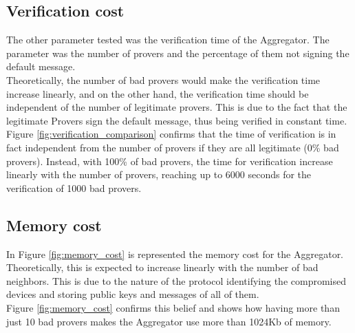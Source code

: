 \subsection{Verification cost}
The other parameter tested was the verification time of the Aggregator. 
The parameter was the number of provers and the percentage of them not signing the default message.\\
Theoretically, the number of bad provers would make the verification time increase linearly, and on the other hand, the verification time should be independent of the number of legitimate provers.
This is due to the fact that the legitimate Provers sign the default message, thus being verified in constant time.\\
Figure \ref{fig:verification_comparison} confirms that the time of verification is in fact independent from the number of provers if they are all legitimate (0\% bad provers).
Instead, with 100\% of bad provers, the time for verification increase linearly with the number of provers, reaching up to 6000 seconds for the verification of 1000 bad provers.



\subsection{Memory cost}
In Figure \ref{fig:memory_cost} is represented the memory cost for the Aggregator.
Theoretically, this is expected to increase linearly with the number of bad neighbors. This is due to the nature of the protocol identifying the compromised devices and storing public keys and messages of all of them.\\
Figure \ref{fig:memory_cost} confirms this belief and shows how having more than just 10 bad provers makes the Aggregator use more than 1024Kb of memory.\\

